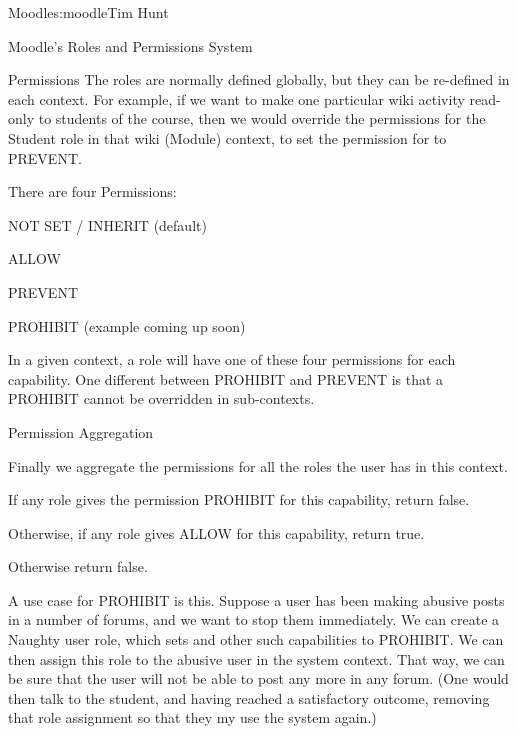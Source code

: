 \begin{aosachapter}{Moodle}{s:moodle}{Tim Hunt}
\begin{aosasect1}{Moodle's Roles and Permissions System}
\begin{aosasect2}{Permissions}
The roles are normally defined globally, but they can be re-defined in
each context. For example, if we want to make one particular wiki
activity read-only to students of the course, then we would override
the permissions for the Student role in that wiki (Module) context, to
set the permission for  to PREVENT.

There are four Permissions:

\begin{aosaitemize}

\item NOT SET / INHERIT (default)

\item ALLOW

\item PREVENT

\item PROHIBIT (example coming up soon)

\end{aosaitemize}

In a given context, a role will have one of these four permissions for
each capability. One different between PROHIBIT and PREVENT is that a
PROHIBIT cannot be overridden in sub-contexts.

\end{aosasect2}

\begin{aosasect2}{Permission Aggregation}

Finally we aggregate the permissions for all the roles the user has in
this context.

\begin{aosaitemize}

\item If any role gives the permission PROHIBIT for this capability,
  return false.

\item Otherwise, if any role gives ALLOW for this capability, return
  true.

\item Otherwise return false.

\end{aosaitemize}

A use case for PROHIBIT is this. Suppose a user has been making
abusive posts in a number of forums, and we want to stop them
immediately. We can create a Naughty user role, which sets
 and other such capabilities to PROHIBIT. We can
then assign this role to the abusive user in the system context. That
way, we can be sure that the user will not be able to post any more in
any forum. (One would then talk to the student, and having reached a
satisfactory outcome, removing that role assignment so that they my
use the system again.)


\end{aosasect2}
\end{aosasect1}
\end{aosachapter}
